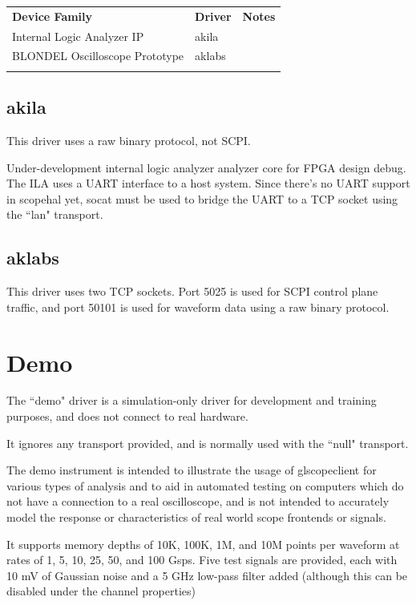 \begin{tabularx}{16cm}{llX}
\thickhline
\textbf{Device Family} & \textbf{Driver} & \textbf{Notes} \\
\thickhline
Internal Logic Analyzer IP & akila & \\
\thickhline
BLONDEL Oscilloscope Prototype & aklabs & \\
\thickhline
\end{tabularx}

\subsection{akila}

This driver uses a raw binary protocol, not SCPI.

Under-development internal logic analyzer analyzer core for FPGA design debug. The ILA uses a UART interface to a host
system. Since there's no UART support in scopehal yet, socat must be used to bridge the UART to a TCP socket using
the ``lan" transport.

\subsection{aklabs}

This driver uses two TCP sockets. Port 5025 is used for SCPI control plane traffic, and port 50101 is used for waveform
data using a raw binary protocol.

\section{Demo}

The ``demo" driver is a simulation-only driver for development and training purposes, and does not connect to real
hardware.

It ignores any transport provided, and is normally used with the ``null" transport.

The demo instrument is intended to illustrate the usage of glscopeclient for various types of analysis and to aid in
automated testing on computers which do not have a connection to a real oscilloscope, and is not intended to accurately
model the response or characteristics of real world scope frontends or signals.

It supports memory depths of 10K, 100K, 1M, and 10M points per waveform at rates of 1, 5, 10, 25, 50, and 100 Gsps.
Five test signals are provided, each with 10 mV of Gaussian noise and a 5 GHz low-pass filter added (although this can
be disabled under the channel properties)

